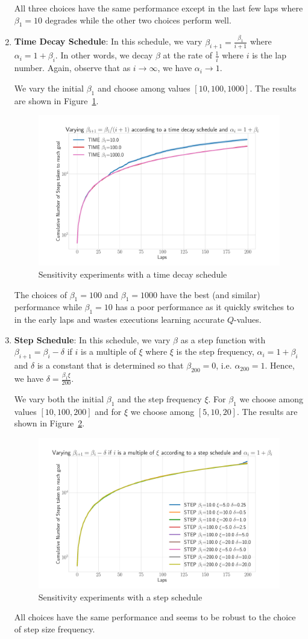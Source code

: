 \begin{enumerate}
All three choices have the same performance except in the last few
laps where $\beta_1 = 10$ degrades while the other two choices perform well.
\item \textbf{Time Decay Schedule}: In this schedule, we vary
  $\beta_{i+1} = \frac{\beta_1}{i+1}$ where $\alpha_i = 1 +
  \beta_i$. In other words, we decay $\beta$ at the rate of
  $\frac{1}{i}$ where $i$ is the lap number. Again, observe that as $i
  \rightarrow \infty$, we have $\alpha_i \rightarrow 1$.

  We vary the initial $\beta_1$ and choose among values $[10, 100,
  1000]$. The results are shown in Figure~\ref{fig:time}.
  \begin{figure}
  \centering
  \includegraphics[width=0.5\linewidth]{figures/cmaxpp/alpha_time.pdf}
  \caption{Sensitivity experiments with a time decay schedule}
  \label{fig:time}
\end{figure}

The choices of $\beta_1 = 100$  and $\beta_1 = 1000$ have the best
(and similar) performance while $\beta_1 = 10$ has a poor performance
as it quickly switches to \cmaxpp{} in the early laps and wastes
executions learning accurate $Q$-values.
\item \textbf{Step Schedule}: In this schedule, we vary $\beta$ as a
  step function with $\beta_{i+1} = \beta_i - \delta$ if $i$ is a
  multiple of $\xi$ where $\xi$ is the step frequency, $\alpha_i = 1 +
  \beta_i$ and $\delta$ is a constant that is determined so that
  $\beta_{200} = 0$, i.e. $\alpha_{200} = 1$. Hence, we have $\delta =
  \frac{\beta_1\xi}{200}$.

  We vary both the initial $\beta_1$ and the step frequency $\xi$. For
  $\beta_1$ we choose among values $[10, 100, 200]$ and for $\xi$ we
  choose among $[5, 10, 20]$. The results are shown in
  Figure~\ref{fig:step}.
  \begin{figure}
  \centering
  \includegraphics[width=0.5\linewidth]{figures/cmaxpp/alpha_step.pdf}
  \caption{Sensitivity experiments with a step schedule}
  \label{fig:step}
\end{figure}

All choices have the same performance and \acmaxpp{} seems to be
robust to the choice of step size frequency.
\end{enumerate}


